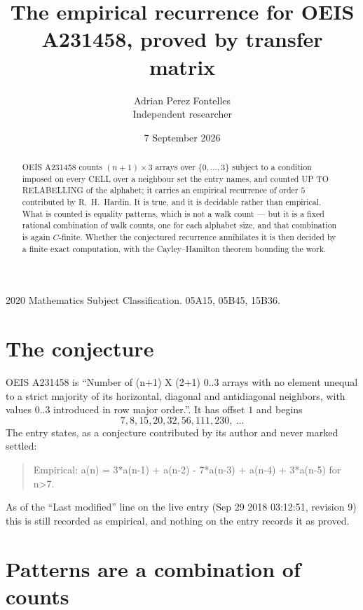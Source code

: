 \documentclass[11pt,a4paper]{article}
\title{The empirical recurrence for OEIS A231458, proved by transfer matrix}
\author{Adrian Perez Fontelles\\ \small Independent researcher}
\date{7 September 2026}
\theoremstyle{plain}
\theoremstyle{definition}
\begin{document}
\maketitle

\begin{abstract}
OEIS A231458 counts $(n+1)\times3$ arrays over $\{0,\dots,3\}$ subject to a condition imposed on
every CELL over a neighbour set the entry names, and counted UP TO RELABELLING of the
alphabet; it carries an empirical recurrence of order $5$ contributed by
R.~H.~Hardin. It is true, and it is decidable rather than empirical. What is counted is
equality patterns, which is not a walk count --- but it is a fixed rational combination of
walk counts, one for each alphabet size, and that combination is again $C$-finite. Whether the
conjectured recurrence annihilates it is then decided by a finite exact computation, with the
Cayley--Hamilton theorem bounding the work.
\end{abstract}

\noindent\small 2020 Mathematics Subject Classification. 05A15, 05B45, 15B36.\normalsize

\section{The conjecture}

OEIS A231458 is ``Number of (n+1) X (2+1) 0..3 arrays with no element unequal to a strict majority of its horizontal, diagonal and antidiagonal neighbors, with values 0..3 introduced in row major order.''. It has offset $1$ and begins
\[
7, 8, 15, 20, 32, 56, 111, 230,\ \dots
\]
The entry states, as a conjecture contributed by its author and never marked settled:
\begin{quote}
Empirical: a(n) = 3*a(n-1) + a(n-2) - 7*a(n-3) + a(n-4) + 3*a(n-5) for n>7.
\end{quote}
As of the ``Last modified'' line on the live entry (Sep 29 2018 03:12:51, revision 9) this is still
recorded as empirical, and nothing on the entry records it as proved.

\section{Patterns are a combination of counts}
\end{document}
